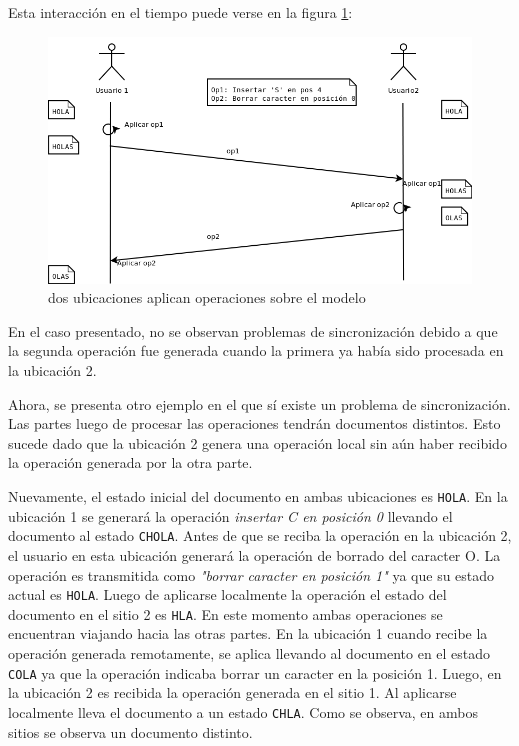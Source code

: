 \documentclass[12pt,a4paper]{article}
\begin{document}
	Esta interacción en el tiempo puede verse en la figura \ref{secuencia_ops_1}:

	\begin{figure}[!ht]
		\begin{center}
			\includegraphics[width=14cm]{sincronizacion_ok.png}
			\caption{\label{secuencia_ops_1} dos ubicaciones aplican operaciones sobre el modelo }
		\end{center}
	\end{figure}

	En el caso presentado, no se observan problemas de sincronización debido a que la segunda operación fue 
	generada cuando la primera ya había sido procesada en la ubicación 2.

	Ahora, se presenta otro ejemplo en el que sí existe un problema de sincronización. Las partes luego de procesar
	las operaciones tendrán documentos distintos. Esto sucede dado que la ubicación 2 genera una operación local 
	sin aún haber recibido la operación generada por la otra parte.
	
	Nuevamente, el estado inicial del documento en ambas ubicaciones es \texttt{HOLA}. En la ubicación 1
	se generará la operación \textit{insertar C en posición 0} llevando el documento al estado \texttt{CHOLA}.
	Antes de que se reciba la operación en la ubicación 2, el usuario en esta ubicación generará la operación
	de borrado del caracter O. La operación es transmitida como \textit{"borrar caracter en posición 1"} ya que
	su estado actual es \texttt{HOLA}. Luego de aplicarse localmente la operación el estado del documento en
	el sitio 2 es \texttt{HLA}.
	En este momento ambas operaciones se encuentran viajando hacia las otras partes. En la ubicación 1 cuando recibe
	la operación generada remotamente, se aplica llevando al documento en el estado \texttt{COLA} ya que la
	operación indicaba borrar un caracter en la posición 1. Luego, en la ubicación 2 es recibida la operación
	generada en el sitio 1. Al aplicarse localmente lleva el documento a un estado \texttt{CHLA}.
	Como se observa, en ambos sitios se observa un documento distinto.
\end{document}
